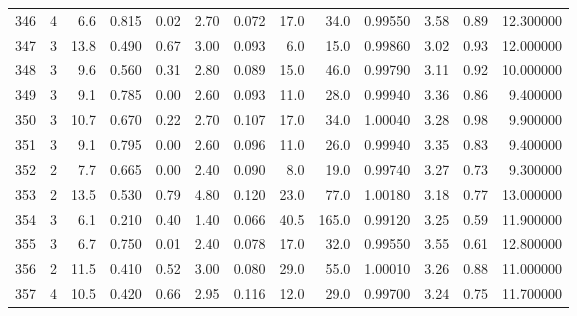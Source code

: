 \begin{tabular}{lrrrrrrrrrrrr}
346  &        4 &            6.6 &             0.815 &         0.02 &            2.70 &      0.072 &                 17.0 &                  34.0 &  0.99550 &  3.58 &       0.89 &  12.300000 \\
347  &        3 &           13.8 &             0.490 &         0.67 &            3.00 &      0.093 &                  6.0 &                  15.0 &  0.99860 &  3.02 &       0.93 &  12.000000 \\
348  &        3 &            9.6 &             0.560 &         0.31 &            2.80 &      0.089 &                 15.0 &                  46.0 &  0.99790 &  3.11 &       0.92 &  10.000000 \\
349  &        3 &            9.1 &             0.785 &         0.00 &            2.60 &      0.093 &                 11.0 &                  28.0 &  0.99940 &  3.36 &       0.86 &   9.400000 \\
350  &        3 &           10.7 &             0.670 &         0.22 &            2.70 &      0.107 &                 17.0 &                  34.0 &  1.00040 &  3.28 &       0.98 &   9.900000 \\
351  &        3 &            9.1 &             0.795 &         0.00 &            2.60 &      0.096 &                 11.0 &                  26.0 &  0.99940 &  3.35 &       0.83 &   9.400000 \\
352  &        2 &            7.7 &             0.665 &         0.00 &            2.40 &      0.090 &                  8.0 &                  19.0 &  0.99740 &  3.27 &       0.73 &   9.300000 \\
353  &        2 &           13.5 &             0.530 &         0.79 &            4.80 &      0.120 &                 23.0 &                  77.0 &  1.00180 &  3.18 &       0.77 &  13.000000 \\
354  &        3 &            6.1 &             0.210 &         0.40 &            1.40 &      0.066 &                 40.5 &                 165.0 &  0.99120 &  3.25 &       0.59 &  11.900000 \\
355  &        3 &            6.7 &             0.750 &         0.01 &            2.40 &      0.078 &                 17.0 &                  32.0 &  0.99550 &  3.55 &       0.61 &  12.800000 \\
356  &        2 &           11.5 &             0.410 &         0.52 &            3.00 &      0.080 &                 29.0 &                  55.0 &  1.00010 &  3.26 &       0.88 &  11.000000 \\
357  &        4 &           10.5 &             0.420 &         0.66 &            2.95 &      0.116 &                 12.0 &                  29.0 &  0.99700 &  3.24 &       0.75 &  11.700000 \\

\end{tabular}
